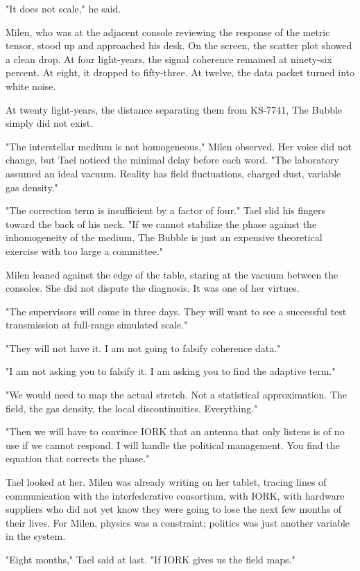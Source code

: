 \documentclass[11pt,a5paper,twoside]{book}
\begin{document}
"It does not scale," he said.

Milen, who was at the adjacent console reviewing the response of the metric tensor, stood up and approached his desk. On the screen, the scatter plot showed a clean drop. At four light-years, the signal coherence remained at ninety-six percent. At eight, it dropped to fifty-three. At twelve, the data packet turned into white noise.

At twenty light-years, the distance separating them from KS-7741, The Bubble simply did not exist.

"The interstellar medium is not homogeneous," Milen observed. Her voice did not change, but Tael noticed the minimal delay before each word. "The laboratory assumed an ideal vacuum. Reality has field fluctuations, charged dust, variable gas density."

"The correction term is insufficient by a factor of four." Tael slid his fingers toward the back of his neck. "If we cannot stabilize the phase against the inhomogeneity of the medium, The Bubble is just an expensive theoretical exercise with too large a committee."

Milen leaned against the edge of the table, staring at the vacuum between the consoles. She did not dispute the diagnosis. It was one of her virtues.

"The supervisors will come in three days. They will want to see a successful test transmission at full-range simulated scale."

"They will not have it. I am not going to falsify coherence data."

"I am not asking you to falsify it. I am asking you to find the adaptive term."

"We would need to map the actual stretch. Not a statistical approximation. The field, the gas density, the local discontinuities. Everything."

"Then we will have to convince IORK that an antenna that only listens is of no use if we cannot respond. I will handle the political management. You find the equation that corrects the phase."

Tael looked at her. Milen was already writing on her tablet, tracing lines of communication with the interfederative consortium, with IORK, with hardware suppliers who did not yet know they were going to lose the next few months of their lives. For Milen, physics was a constraint; politics was just another variable in the system.

"Eight months," Tael said at last. "If IORK gives us the field maps."
\end{document}
